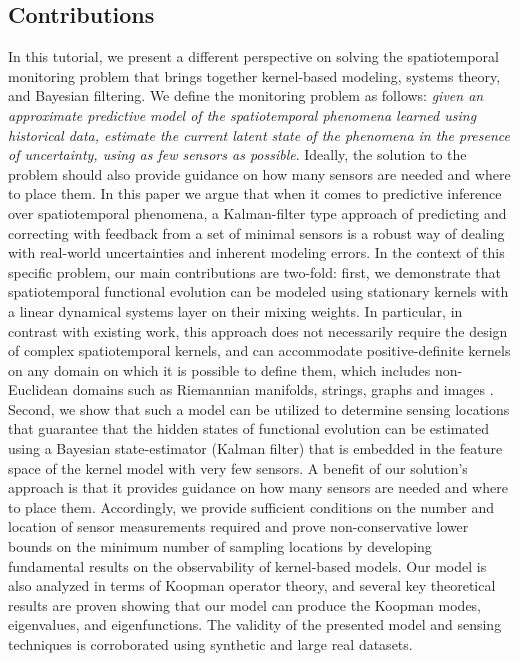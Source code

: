 \subsection{Contributions}
In this tutorial, we present a different perspective on solving the spatiotemporal monitoring problem that brings together kernel-based modeling, systems theory, and Bayesian filtering. We define the monitoring problem as follows: \textit{given an approximate predictive model of the spatiotemporal phenomena learned using historical data, estimate the current latent state of the phenomena in the presence of uncertainty, using as few sensors as possible}. Ideally, the solution to the problem should also provide guidance on how many sensors are needed and where to place them. In this paper we argue that when it comes to predictive inference over spatiotemporal phenomena, a Kalman-filter type approach of predicting and correcting with feedback from a set of minimal sensors is a robust way of dealing with real-world uncertainties and inherent modeling errors.  In the context of this specific problem, our main contributions are two-fold: first, we demonstrate that spatiotemporal functional evolution can be modeled using stationary kernels with a linear dynamical systems layer on their mixing weights. In particular, in contrast with existing work, this approach does not necessarily require the design of complex spatiotemporal kernels, and can accommodate positive-definite kernels on any domain on which it is possible to define them, which includes non-Euclidean domains such as Riemannian manifolds, strings, graphs and images \cite{Jayasumana_PAMI2015_RBFs}. Second, we show that such a model can be utilized to determine sensing locations that guarantee that the hidden states of functional evolution can be estimated using a Bayesian state-estimator (Kalman filter) that is embedded in the feature space of the kernel model with very few sensors. A benefit of our solution's approach is that it provides guidance on how many sensors are needed and where to place them. Accordingly, we provide sufficient conditions on the number and location of sensor measurements required and prove non-conservative lower bounds on the minimum number of sampling locations by developing fundamental results on the observability of kernel-based models. Our model is also analyzed in terms of Koopman operator theory, and several key theoretical results are proven showing that our model can produce the Koopman modes, eigenvalues, and eigenfunctions. 
The validity of the presented model and sensing techniques is corroborated using synthetic and large real datasets. 

